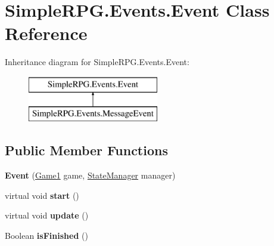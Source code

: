 \hypertarget{class_simple_r_p_g_1_1_events_1_1_event}{\section{Simple\-R\-P\-G.\-Events.\-Event Class Reference}
\label{class_simple_r_p_g_1_1_events_1_1_event}
}
Inheritance diagram for Simple\-R\-P\-G.\-Events.\-Event\-:\begin{figure}[H]
\begin{center}
\leavevmode
\includegraphics[height=2.000000cm]{class_simple_r_p_g_1_1_events_1_1_event}
\end{center}
\end{figure}
\subsection*{Public Member Functions}
\begin{DoxyCompactItemize}
\item 
\hypertarget{class_simple_r_p_g_1_1_events_1_1_event_ab7dfb6fbd4e0d5f9489bab5a7c129230}{{\bfseries Event} (\hyperlink{class_simple_r_p_g_1_1_game1}{Game1} game, \hyperlink{class_simple_r_p_g_1_1_states_1_1_state_manager}{State\-Manager} manager)}\label{class_simple_r_p_g_1_1_events_1_1_event_ab7dfb6fbd4e0d5f9489bab5a7c129230}

\item 
\hypertarget{class_simple_r_p_g_1_1_events_1_1_event_ad2ba4008dc240e6f5112def47a7239bd}{virtual void {\bfseries start} ()}\label{class_simple_r_p_g_1_1_events_1_1_event_ad2ba4008dc240e6f5112def47a7239bd}

\item 
\hypertarget{class_simple_r_p_g_1_1_events_1_1_event_af827a485fcc3cd3e52a3ecd306bf0c57}{virtual void {\bfseries update} ()}\label{class_simple_r_p_g_1_1_events_1_1_event_af827a485fcc3cd3e52a3ecd306bf0c57}

\item 
\hypertarget{class_simple_r_p_g_1_1_events_1_1_event_aaa5a7c0b6f04cd6564be3bcd69621279}{Boolean {\bfseries is\-Finished} ()}\label{class_simple_r_p_g_1_1_events_1_1_event_aaa5a7c0b6f04cd6564be3bcd69621279}

\end{DoxyCompactItemize}
